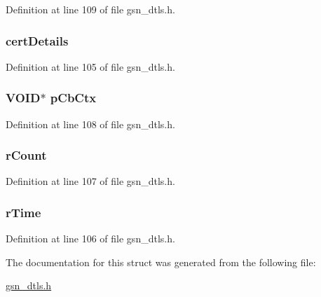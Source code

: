 Definition at line 109 of file gsn\_\-dtls.h.

\hypertarget{a00056_a5000a356346b9a069211acdb422a1353}{
\subsubsection[{certDetails}]{ {\bf certDetails}}}
\label{a00056_a5000a356346b9a069211acdb422a1353}


Definition at line 105 of file gsn\_\-dtls.h.

\hypertarget{a00056_a040e2d4627baec5f0f81086400c1b66a}{
\subsubsection[{pCbCtx}]{\setlength{\rightskip}{0pt plus 5cm}VOID$\ast$ {\bf pCbCtx}}}
\label{a00056_a040e2d4627baec5f0f81086400c1b66a}


Definition at line 108 of file gsn\_\-dtls.h.

\hypertarget{a00056_a4e6d43234fc23c311a827ca792a06f39}{
\subsubsection[{rCount}]{ {\bf rCount}}}
\label{a00056_a4e6d43234fc23c311a827ca792a06f39}


Definition at line 107 of file gsn\_\-dtls.h.

\hypertarget{a00056_aaf93463b79d7a5e2afa4a3849a564ba2}{
\subsubsection[{rTime}]{ {\bf rTime}}}
\label{a00056_aaf93463b79d7a5e2afa4a3849a564ba2}


Definition at line 106 of file gsn\_\-dtls.h.



The documentation for this struct was generated from the following file:\begin{DoxyCompactItemize}
\item 
\hyperlink{a00487}{gsn\_\-dtls.h}\end{DoxyCompactItemize}
